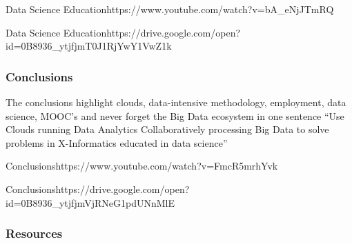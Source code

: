    {Data Science  Education}{https://www.youtube.com/watch?v=bA_eNjJTmRQ}


  {Data  Science Education}{https://drive.google.com/open?id=0B8936_ytjfjmT0J1RjYwY1VwZ1k}


\subsubsection{Conclusions}\label{conclusions}

The conclusions highlight clouds, data-intensive methodology,
employment, data science, MOOC's and never forget the Big Data ecosystem
in one sentence ``Use Clouds running Data Analytics Collaboratively
processing Big Data to solve problems in X-Informatics educated in data
science''


  {Conclusions}{https://www.youtube.com/watch?v=FmcR5mrhYvk}

  {Conclusions}{https://drive.google.com/open?id=0B8936_ytjfjmVjRNeG1pdUNnMlE}


\subsubsection{Resources}\label{resources}

